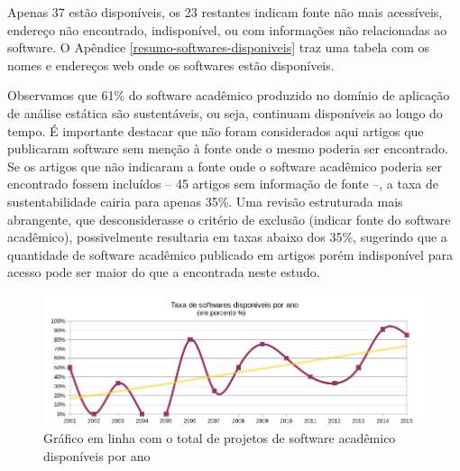 Apenas 37 estão disponíveis, os 23 restantes indicam fonte não mais
acessíveis, endereço não encontrado, indisponível, ou com informações não
relacionadas ao software. 
O Apêndice \ref{resumo-softwares-disponiveis} traz
uma tabela com os nomes e endereços web onde os softwares estão disponíveis.

Observamos que 61\% do software acadêmico produzido no domínio de aplicação de análise estática 
são sustentáveis, ou seja, continuam disponíveis ao longo do tempo. 
É importante destacar que não foram considerados aqui artigos que publicaram software 
sem menção à fonte onde o mesmo poderia ser encontrado.
Se os artigos que não indicaram a fonte onde o software acadêmico poderia ser encontrado
fossem incluídos -- 45 artigos sem informação de fonte --, 
a taxa de sustentabilidade cairia para apenas 35\%.
Uma revisão estruturada mais abrangente, que desconsiderasse o critério de exclusão
(indicar fonte do software acadêmico), possivelmente resultaria em taxas abaixo dos 35\%, 
sugerindo que a quantidade de software acadêmico publicado em artigos porém indisponível para acesso
pode ser maior do que a encontrada neste estudo.


\begin{figure}[h]
  \center
  \includegraphics[scale=0.65]{imagens/softwares-disponivel-por-ano.png}
  \caption{Gráfico em linha com o total de projetos de software acadêmico disponíveis por ano}
  \label{softwares-disponivel-por-ano}
\end{figure}

